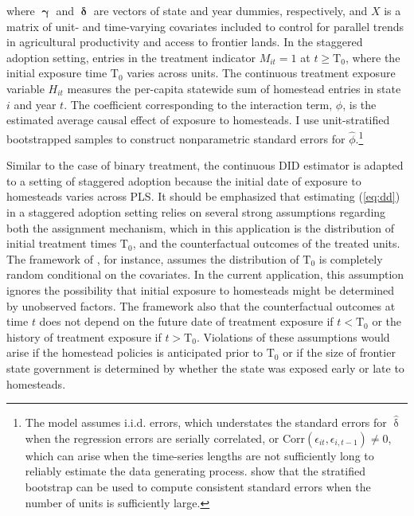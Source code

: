 \documentclass[hidelinks,12pt]{article}
\begin{document}
where $\boldsymbol{\upgamma}$ and $\boldsymbol{\updelta}$ are vectors of state and year dummies, respectively, and $X$ is a matrix of unit- and time-varying covariates included to control for parallel trends in agricultural productivity and access to frontier lands. In the staggered adoption setting, entries in the treatment indicator $M_{it} = 1$ at $t \geq  \text{T}_0$, where the initial exposure time $\text{T}_0$ varies across units. The continuous treatment exposure variable $H_{it}$ measures the per-capita statewide sum of homestead entries in state $i$ and year $t$. The coefficient corresponding to the interaction term, $\hat{\phi}$, is the estimated average causal effect of exposure to homesteads. I use unit-stratified bootstrapped samples to construct nonparametric standard errors for $\hat{\phi}$.\footnote{The model assumes i.i.d. errors, which understates the standard errors for $\hat{\updelta}$ when the regression errors are serially correlated, or $\mathrm{Corr} (\epsilon_{it}, \epsilon_{i,t-1}) \neq 0$, which can arise when the time-series lengths are not sufficiently long to reliably estimate the data generating process. \citet{bertrand2004much} show that the stratified bootstrap can be used to compute consistent standard errors when the number of units is sufficiently large.} 

Similar to the case of binary treatment, the continuous DID estimator is adapted to a setting of staggered adoption because the initial date of exposure to homesteads varies across PLS. It should be emphasized that estimating (\ref{eq:dd}) in a staggered adoption setting relies on several strong assumptions regarding both the assignment mechanism, which in this application is the distribution of initial treatment times $\text{T}_0$, and the counterfactual outcomes of the treated units. The framework of \citet{athey2018design}, for instance, assumes the distribution of $\text{T}_0$ is completely random conditional on the covariates. In the current application, this assumption ignores the possibility that initial exposure to homesteads might be determined by unobserved factors. The framework also that the counterfactual outcomes at time $t$ does not depend on the future date of treatment exposure if $t <  \text{T}_0$ or the history of treatment exposure if $t >  \text{T}_0$. Violations of these assumptions would arise if the homestead policies is anticipated prior to $\text{T}_0$ or if the size of frontier state government is determined by whether the state was exposed early or late to homesteads. 
\end{document}
